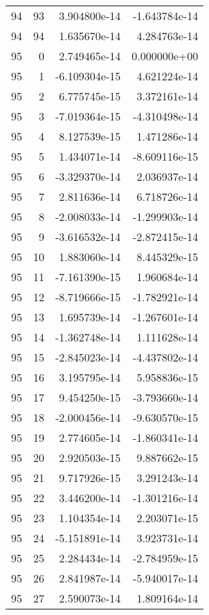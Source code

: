 \begin{tabular}{rrrr}
  94 &   93 &  3.904800e-14 & -1.643784e-14 \\
  94 &   94 &  1.635670e-14 &  4.284763e-14 \\
  95 &    0 &  2.749465e-14 &  0.000000e+00 \\
  95 &    1 & -6.109304e-15 &  4.621224e-14 \\
  95 &    2 &  6.775745e-15 &  3.372161e-14 \\
  95 &    3 & -7.019364e-15 & -4.310498e-14 \\
  95 &    4 &  8.127539e-15 &  1.471286e-14 \\
  95 &    5 &  1.434071e-14 & -8.609116e-15 \\
  95 &    6 & -3.329370e-14 &  2.036937e-14 \\
  95 &    7 &  2.811636e-14 &  6.718726e-14 \\
  95 &    8 & -2.008033e-14 & -1.299903e-14 \\
  95 &    9 & -3.616532e-14 & -2.872415e-14 \\
  95 &   10 &  1.883060e-14 &  8.445329e-15 \\
  95 &   11 & -7.161390e-15 &  1.960684e-14 \\
  95 &   12 & -8.719666e-15 & -1.782921e-14 \\
  95 &   13 &  1.695739e-14 & -1.267601e-14 \\
  95 &   14 & -1.362748e-14 &  1.111628e-14 \\
  95 &   15 & -2.845023e-14 & -4.437802e-14 \\
  95 &   16 &  3.195795e-14 &  5.958836e-15 \\
  95 &   17 &  9.454250e-15 & -3.793660e-14 \\
  95 &   18 & -2.000456e-14 & -9.630570e-15 \\
  95 &   19 &  2.774605e-14 & -1.860341e-14 \\
  95 &   20 &  2.920503e-15 &  9.887662e-15 \\
  95 &   21 &  9.717926e-15 &  3.291243e-14 \\
  95 &   22 &  3.446200e-14 & -1.301216e-14 \\
  95 &   23 &  1.104354e-14 &  2.203071e-15 \\
  95 &   24 & -5.151891e-14 &  3.923731e-14 \\
  95 &   25 &  2.284434e-14 & -2.784959e-15 \\
  95 &   26 &  2.841987e-14 & -5.940017e-14 \\
  95 &   27 &  2.590073e-14 &  1.809164e-14 \\

\end{tabular}
